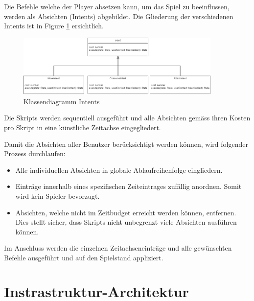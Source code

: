 \documentclass[11pt,a4paper]{scrartcl}
\let\oldsection\section
\renewcommand\section{\clearpage\oldsection}
\begin{document}
Die Befehle welche der Player absetzen kann, um das Spiel zu beeinflussen, werden als Absichten (Intents) abgebildet.
Die Gliederung der verschiedenen Intents ist in Figure \ref{fig:classDiagramIntents} ersichtlich.

\begin{figure}[h]
  \label{fig:classDiagramIntents}
  \centering
  \includegraphics[width=0.9\textwidth]{Intent}
  \caption{Klassendiagramm Intents}
\end{figure}

Die Skripts werden sequentiell ausgeführt und alle Absichten gemäss ihren Kosten pro Skript in eine künstliche Zeitachse eingegliedert.

Damit die Absichten aller Benutzer berücksichtigt werden können, wird folgender Prozess durchlaufen:
\begin{itemize}
  \item Alle individuellen Absichten in globale Ablaufreihenfolge eingliedern.
  \item Einträge innerhalb eines spezifischen Zeiteintrages zufällig anordnen. Somit wird kein Spieler bevorzugt.
  \item Absichten, welche nicht im Zeitbudget erreicht werden können, entfernen. Dies stellt sicher, dass Skripts nicht unbegrenzt viele Absichten ausführen können.
\end{itemize}

Im Anschluss werden die einzelnen Zeitachseneinträge und alle gewünschten Befehle ausgeführt und auf den Spielstand appliziert.

\section{Instrastruktur-Architektur}
\label{InfrastructureArchitecture}
\end{document}
